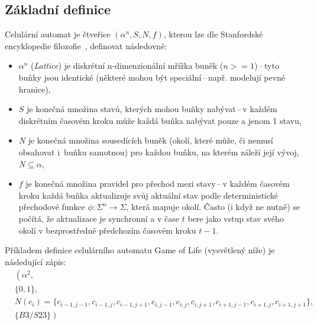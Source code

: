 \subsection*{Základní definice }
Celulární automat je čtveřice ${(\alpha^{n}, S, N, f)}$, kterou lze dle Stanfordské encyklopedie filozofie~\cite{sep-cellular-automata}, definovat následovně:
\begin{itemize}
    \item ${ \alpha^{n} }$ (\textit{Lattice}) je diskrétní n-dimenzionální mřížka buněk (${ n >= 1 }$)\,--\,tyto buňky jsou identické (některé mohou být speciální\,--\,např. modelují pevné hranice), 
    \item ${ S }$ je konečná množina stavů, kterých mohou buňky nabývat\,--\,v každém diskrétním časovém kroku může každá buňka nabývat pouze a jenom 1 stavu, 
    \item ${ N }$ je konečná množina sousedících buněk (okolí, které může, či nemusí obsahovat i~buňku samotnou) pro každou buňku, na kterém záleží její vývoj, ${ N \subseteq \alpha }$,
    \item ${ f }$ je konečná množina pravidel pro přechod mezi stavy\,--\,v každém časovém kroku každá buňka aktualizuje svůj aktuální stav podle deterministické přechodové funkce $\phi : \Sigma^n \rightarrow \Sigma$, která mapuje okolí. Často (i když ne nutně) se počítá, že aktualizace je synchronní a v čase $t$ bere jako vstup stav svého okolí v bezprostředně předchozím časovém kroku $t-1$.
\end{itemize}
Příkladem definice celulárního automatu Game of Life (vysvětlený níže) je následující zápis:
\begin{equation*}
\begin{split}
    & \left( \alpha^{2}, \right. \\
    & \left. \{0, 1\}, \right. \\
    & \left. N(c_i) = \{ c_{i-1,j-1}, c_{i-1,j}, c_{i-1,j+1}, c_{i,j-1}, c_{i,j}, c_{i,j+1}, c_{i+1,j-1}, c_{i+1,j}, c_{i+1,j+1} \}, \right. \\
    & \left. \{B3/S23\} \right)
\end{split}
\end{equation*}

